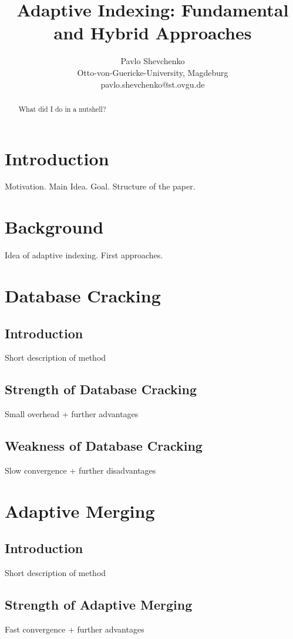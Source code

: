 \documentclass[10pt, conference, compsocconf]{IEEEtran}
\begin{document}
\title{Adaptive Indexing: Fundamental and Hybrid Approaches}
\author{Pavlo Shevchenko \\ Otto-von-Guericke-University, Magdeburg \\ pavlo.shevchenko@st.ovgu.de}

\maketitle

\begin{abstract}
What did I do in a nutshell?
\end{abstract}

\section{Introduction}
Motivation. Main Idea. Goal. Structure of the paper.

\section{Background}
Idea of adaptive indexing. First approaches.

\section{Database Cracking}
\subsection{Introduction}
Short description of method 
\subsection{Strength of Database Cracking}
Small overhead + further advantages
\subsection{Weakness of Database Cracking}
Slow convergence + further disadvantages

\section{Adaptive Merging}
\subsection{Introduction}
Short description of method
\subsection{Strength of Adaptive Merging}
Fast convergence + further advantages
\end{document}
